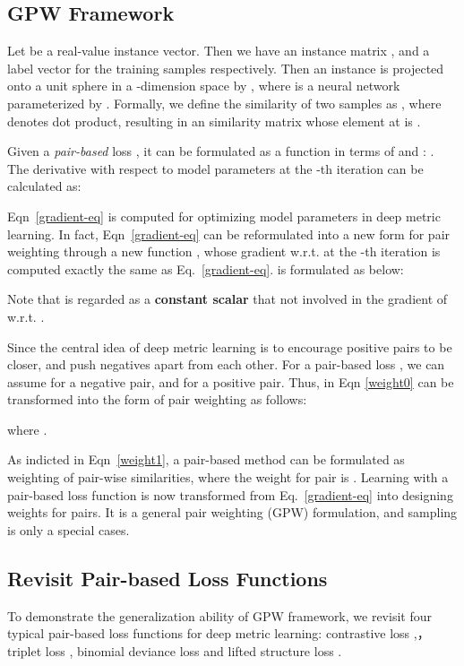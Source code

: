 \documentclass[10pt,twocolumn,letterpaper]{article}
\begin{document}
\subsection{GPW Framework}
\label{subsection-weighting}
 Let  be a real-value instance vector. Then we have an instance matrix , and a label vector   for the  training samples respectively.  Then an instance   is projected onto a unit sphere in a -dimension space by , where  is a neural network parameterized by .
Formally, we define the similarity of two samples as , where  denotes dot product, resulting in an  similarity matrix  whose element at  is .

Given a {\it pair-based} loss , it can be formulated as a function in terms of  and : . The derivative with respect to model parameters  at the -th iteration can be calculated as: 

 Eqn~\ref{gradient-eq} is computed for optimizing model parameters  in deep metric learning. In fact, Eqn~\ref{gradient-eq} can be reformulated into a new form for pair weighting through a new function , whose gradient w.r.t.  at the -th iteration is computed exactly the same as Eq.~\ref{gradient-eq}.  is formulated as below:
 

Note that   is regarded as a \textbf{constant scalar} that not involved in the gradient of  w.r.t. .

  Since the central idea of deep metric learning is to encourage positive pairs to be closer, and push negatives apart from each other. For a pair-based loss , we can assume  for a negative pair, and  for a positive pair. Thus,  in Eqn \ref{weight0} can be transformed into the form of pair weighting as follows:

where .


As indicted in Eqn~\ref{weight1}, a pair-based method can be formulated as weighting of pair-wise similarities, where the weight for pair  is .
Learning with a pair-based loss function  is now transformed from Eq.~\ref{gradient-eq} into designing weights for pairs. It is a general pair weighting (GPW) formulation, and sampling is only a special cases. 


\subsection{Revisit Pair-based Loss Functions}
\label{subsection-rethinking}
To demonstrate the generalization ability of GPW framework, we revisit four typical pair-based loss functions for deep metric learning: contrastive loss \cite{contrastive},， triplet loss \cite{Hoffer2015DeepML}, binomial deviance loss \cite{binomial} and lifted structure loss  \cite{lifted-structured-loss}. 
\end{document}
